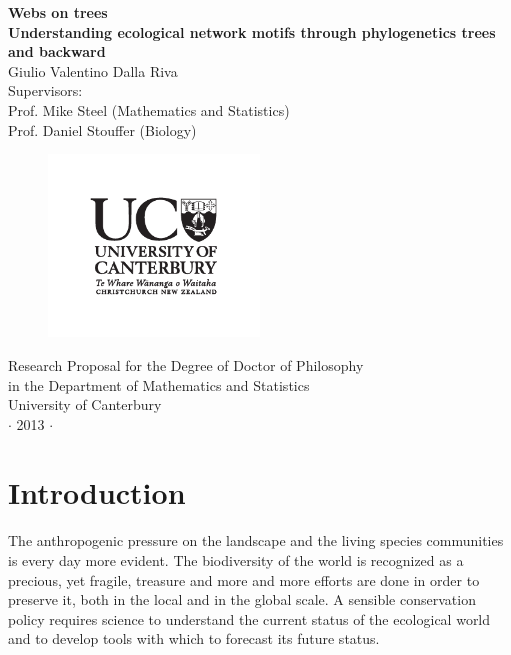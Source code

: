 \documentclass[12pt,a4paper]{report}
\begin{document}
\pagestyle{empty}
\begin{center}
{\Large \textbf{Webs on trees}\\}
{\large \textbf{Understanding ecological network motifs through phylogenetics trees and backward\\}}
\vspace{1cm}
{\large 
Giulio Valentino Dalla Riva\\
\vspace{0.5cm}
Supervisors: \\
Prof. Mike Steel (Mathematics and Statistics)\\
Prof. Daniel Stouffer (Biology)}\\
\end{center}

\begin{figure}[h]
	\centering
		\includegraphics[width=0.5\textwidth]{images/UClogo}
\end{figure}

\vspace{1cm}
\begin{center}
{\large  
Research Proposal for the Degree of Doctor of Philosophy\\
in the Department of Mathematics and Statistics\\
University of Canterbury\\
\vspace{0.3cm}
$\cdot$ 2013 $\cdot$}
\end{center}
\vspace{1cm}
\tableofcontents

\chapter{Introduction}

The anthropogenic pressure on the landscape and the living species communities is every day more evident. The biodiversity of the world is recognized as a precious, yet fragile, treasure and more and more efforts are done in order to preserve it, both in the local and in the global scale. A sensible conservation policy requires science to understand the current status of the ecological world and to develop tools with which to forecast its future status.
\end{document}
